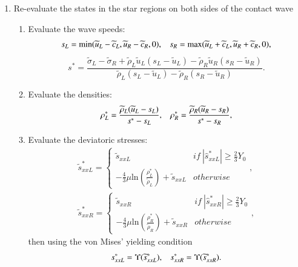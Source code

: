 \documentclass[review]{elsarticle}
\begin{document}
\begin{enumerate}
\begin{enumerate}
        \end{enumerate}
  \item Re-evaluate the states in the star regions on both sides of the contact wave
  \begin{enumerate}
    \item Evaluate the wave speeds:
\begin{equation*}
  s_L = \text{min} (\widetilde{u}_L-\widetilde{c}_L, \widetilde{u}_R-\widetilde{c}_R,0), \hspace{0.3cm} s_R = \text{max}(\widetilde{u}_L+\widetilde{c}_L, \widetilde{u}_R+\widetilde{c}_R,0),
    \end{equation*}
    \begin{equation*}
      s^* = \frac{\widetilde{\sigma}_L-\widetilde{\sigma}_R+\widetilde{\rho}_L \widetilde{u}_L(s_L-\widetilde{u}_L)-\widetilde{\rho}_R \widetilde{u}_R(s_R-\widetilde{u}_R)}{\widetilde{\rho}_L(s_L-\widetilde{u}_L)-\widetilde{\rho}_R(s_R-\widetilde{u}_R)}.
\end{equation*}

    \item Evaluate the densities:
\begin{equation*}
  \rho_L^* = \frac{\widetilde{\rho}_L(\widetilde{u}_L-s_L)}{s^*-s_L}, \hspace{0.3cm}  \rho_R^* = \frac{\widetilde{\rho}_R(\widetilde{u}_R-s_R)}{s^*-s_R},
\end{equation*}

    \item Evaluate the deviatoric stresses:
 \begin{align*}
   \widetilde{s}_{xxL}^* = \left\{\begin{array}{cc}
                       \widetilde{s}_{xxL} & if \ |\hat{s}_{xxL}^{*}|\geq \frac{2}{3}Y_{0} \\
                        -\frac{4}{3}\mu \text{ln}\left( \frac{\rho_L^*}{\widetilde{\rho}_L}  \right)+\widetilde{s}_{xxL} & otherwise
                     \end{array}\right.
   ,\\
   \widetilde{s}_{xxR}^* =  \left\{\begin{array}{cc}
                       \widetilde{s}_{xxR} & if \ |\hat{s}_{xxR}^{*}| \geq \frac{2}{3}Y_{0} \\
                        -\frac{4}{3}\mu \text{ln}\left( \frac{\rho_R^*}{\widetilde{\rho}_R}  \right)+\widetilde{s}_{xxR} & otherwise
                     \end{array}\right.
    ,
\end{align*}
then using  the von Mises' yielding condition
\begin{equation*}
  s_{xxL}^* = \Upsilon(\widetilde{s}_{xxL}^*) , \hspace{0.3cm}  s_{xxR}^* = \Upsilon(\widetilde{s}_{xxR}^*).
\end{equation*}


\end{enumerate}
\end{enumerate}
\end{document}
